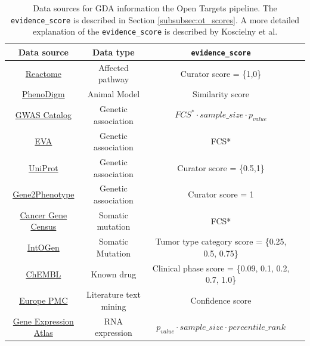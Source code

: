 \begin{table}[H]
\centering
    \begin{tabular}{c|c|c|c}
      Data source & Data type & \texttt{evidence\_score} \\
      \hline
      
      \href{https://goo.gl/sfm7CC}{Reactome} & Affected pathway &
      Curator score = \{1,0\} \\
      
      \href{https://goo.gl/egMxCH}{PhenoDigm} & Animal Model &
      Similarity score \cite{PhenoDigm2013} \\
      
      \href{https://goo.gl/A4UjA5}{GWAS Catalog} & Genetic association &
      $ FCS^* \cdot sample\_size \cdot p_{value} $ \\
      
      \href{https://goo.gl/Vavb1L}{EVA} & Genetic association & 
      FCS* \\
      
      \href{https://goo.gl/5SiDMj}{UniProt} & Genetic association &
      Curator score = \{0.5,1\} \\
      
      \href{https://goo.gl/qwDPhK}{Gene2Phenotype} & Genetic association &
      Curator score = 1 \\
      
      \href{https://goo.gl/dXL3jQ}{Cancer Gene Census} & Somatic mutation &
      FCS* \\
      
      \href{https://goo.gl/kTWn6z}{IntOGen} & Somatic Mutation &
      Tumor type category score = \{0.25, 0.5, 0.75\}\\
      
      \href{https://goo.gl/tJ2wzt}{ChEMBL} & Known drug & Clinical phase score = \{0.09, 0.1, 0.2, 0.7, 1.0\} \\
      
      \href{https://goo.gl/P3UAc9}{Europe PMC} & Literature text mining & Confidence score \cite{kafkas2017} \\
      
      \href{https://goo.gl/1eQbbs}{Gene Expression Atlas} & RNA expression & $p_{value} \cdot sample\_size \cdot percentile\_rank $ \\
      
      \end{tabular}
\caption{Data sources for GDA information the Open Targets pipeline. The \texttt{evidence\_score} is described in Section \ref{subsubsec:ot_scores}. A more detailed explanation of the \texttt{evidence\_score} is described by Koscielny et al. \cite{koscielny2016} \label{tab:ot_db}}
\end{table}

